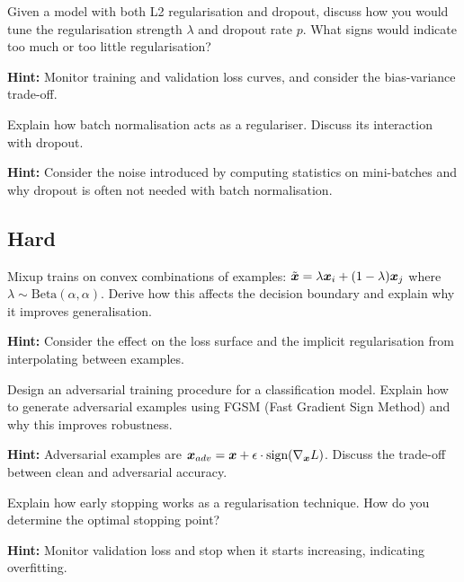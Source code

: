 \begin{problem}
Given a model with both L2 regularisation and dropout, discuss how you would tune the regularisation strength $\lambda$ and dropout rate $p$. What signs would indicate too much or too little regularisation?

\textbf{Hint:} Monitor training and validation loss curves, and consider the bias-variance trade-off.
\end{problem}

\begin{problem}
Explain how batch normalisation acts as a regulariser. Discuss its interaction with dropout.

\textbf{Hint:} Consider the noise introduced by computing statistics on mini-batches and why dropout is often not needed with batch normalisation.
\end{problem}

\subsection*{Hard}

\begin{problem}
Mixup trains on convex combinations of examples: $\tilde{\boldsymbol{x}} = \lambda \boldsymbol{x}_i + (1-\lambda)\boldsymbol{x}_j$ where $\lambda \sim \text{Beta}(\alpha, \alpha)$. Derive how this affects the decision boundary and explain why it improves generalisation.

\textbf{Hint:} Consider the effect on the loss surface and the implicit regularisation from interpolating between examples.
\end{problem}

\begin{problem}
Design an adversarial training procedure for a classification model. Explain how to generate adversarial examples using FGSM (Fast Gradient Sign Method) and why this improves robustness.

\textbf{Hint:} Adversarial examples are $\boldsymbol{x}_{adv} = \boldsymbol{x} + \epsilon \cdot \text{sign}(\nabla_{\boldsymbol{x}} L)$. Discuss the trade-off between clean and adversarial accuracy.
\end{problem}

\begin{problem}
Explain how early stopping works as a regularisation technique. How do you determine the optimal stopping point?

\textbf{Hint:} Monitor validation loss and stop when it starts increasing, indicating overfitting.
\end{problem}

